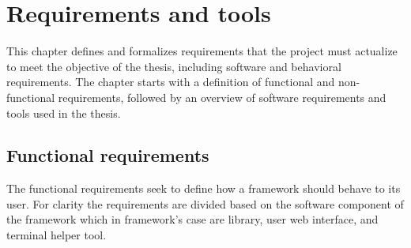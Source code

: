 \documentclass[
    bindingoffset=5mm,  %
    footnoteindent=3mm, %
    hyphenation=true    %
]{src/wut-thesis}
\begin{document}
\section{Requirements and tools} \label{ch:reqrTools}

        This chapter defines and formalizes requirements that the project must actualize
    to meet the objective of the thesis, including software and behavioral requirements.
    The chapter starts with a definition of functional and non-functional requirements,
    followed by an overview of software requirements and tools used in the thesis.

\subsection{Functional requirements}

    The functional requirements seek to define how a framework should behave to its user.
    For clarity the requirements are divided based on the software component of the framework which
    in framework's case are library, user web interface, and terminal helper tool.

\end{document}
